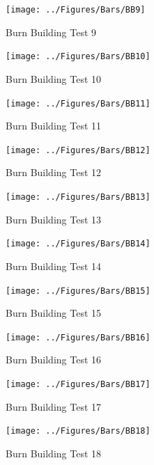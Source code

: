 \documentclass[12pt,oneside]{book}
\begin{document}
\clearpage

\begin{figure}[!ht]
	\texttt{[image: ../Figures/Bars/BB9]}
	\caption{Burn Building Test 9}
	\label{fig:Burn_Building_Test_9}
\end{figure}

\begin{figure}[!ht]
	\texttt{[image: ../Figures/Bars/BB10]}
	\caption{Burn Building Test 10}
	\label{fig:Burn_Building_Test_10}
\end{figure}

\begin{figure}[!ht]
	\texttt{[image: ../Figures/Bars/BB11]}
	\caption{Burn Building Test 11}
	\label{fig:Burn_Building_Test_11}
\end{figure}

\begin{figure}[!ht]
	\texttt{[image: ../Figures/Bars/BB12]}
	\caption{Burn Building Test 12}
	\label{fig:Burn_Building_Test_12}
\end{figure}

\clearpage

\begin{figure}[!ht]
	\texttt{[image: ../Figures/Bars/BB13]}
	\caption{Burn Building Test 13}
	\label{fig:Burn_Building_Test_13}
\end{figure}

\begin{figure}[!ht]
	\texttt{[image: ../Figures/Bars/BB14]}
	\caption{Burn Building Test 14}
	\label{fig:Burn_Building_Test_14}
\end{figure}

\begin{figure}[!ht]
	\texttt{[image: ../Figures/Bars/BB15]}
	\caption{Burn Building Test 15}
	\label{fig:Burn_Building_Test_15}
\end{figure}

\begin{figure}[!ht]
	\texttt{[image: ../Figures/Bars/BB16]}
	\caption{Burn Building Test 16}
	\label{fig:Burn_Building_Test_16}
\end{figure}

\clearpage

\begin{figure}[!ht]
	\texttt{[image: ../Figures/Bars/BB17]}
	\caption{Burn Building Test 17}
	\label{fig:Burn_Building_Test_17}
\end{figure}

\begin{figure}[!ht]
	\texttt{[image: ../Figures/Bars/BB18]}
	\caption{Burn Building Test 18}
	\label{fig:Burn_Building_Test_18}
\end{figure}
\end{document}

